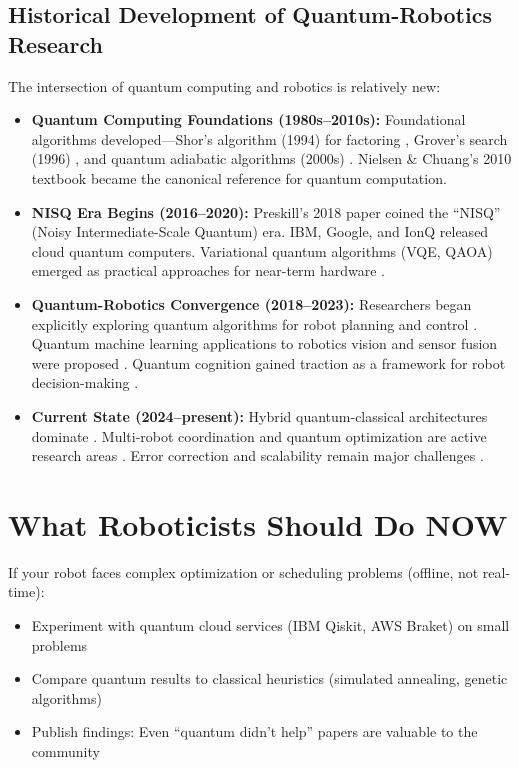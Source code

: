\documentclass[conference]{IEEEtran}
\begin{document}
\subsection{Historical Development of Quantum-Robotics Research}

The intersection of quantum computing and robotics is relatively new:

\begin{itemize}
\item \textbf{Quantum Computing Foundations (1980s--2010s):} Foundational algorithms developed---Shor's algorithm (1994) for factoring \cite{b28}, Grover's search (1996) \cite{b28}, and quantum adiabatic algorithms (2000s) \cite{b15}. Nielsen \& Chuang's 2010 textbook \cite{b4} became the canonical reference for quantum computation.

\item \textbf{NISQ Era Begins (2016--2020):} Preskill's 2018 paper \cite{b9} coined the ``NISQ'' (Noisy Intermediate-Scale Quantum) era. IBM, Google, and IonQ released cloud quantum computers. Variational quantum algorithms (VQE, QAOA) emerged as practical approaches for near-term hardware \cite{b15, b20, b21}.

\item \textbf{Quantum-Robotics Convergence (2018--2023):} Researchers began explicitly exploring quantum algorithms for robot planning and control \cite{b6, b7, b8}. Quantum machine learning applications to robotics vision and sensor fusion were proposed \cite{b19, b23}. Quantum cognition gained traction as a framework for robot decision-making \cite{b49, b50, b62}.

\item \textbf{Current State (2024--present):} Hybrid quantum-classical architectures dominate \cite{b20, b21}. Multi-robot coordination and quantum optimization are active research areas \cite{b6, b7}. Error correction and scalability remain major challenges \cite{b13, b14}.
\end{itemize}

\section{What Roboticists Should Do NOW}

If your robot faces complex optimization or scheduling problems (offline, not real-time):

\begin{itemize}
\item Experiment with quantum cloud services (IBM Qiskit, AWS Braket) on small problems
\item Compare quantum results to classical heuristics (simulated annealing, genetic algorithms) \cite{b60, b59}
\item Publish findings: Even ``quantum didn't help'' papers are valuable to the community
\end{itemize}
\end{document}
